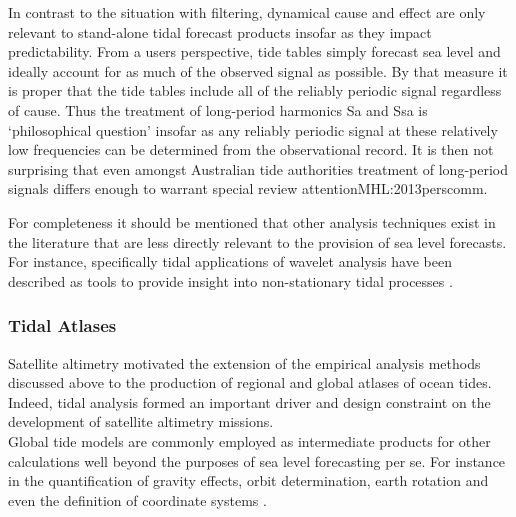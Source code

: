 In contrast to the situation with filtering, dynamical cause and effect are only relevant to stand-alone tidal forecast products insofar as they impact predictability.  From a users perspective, tide tables simply forecast sea level and ideally account for as much of the observed signal as possible.   By that measure it is proper that the tide tables include all of the reliably periodic signal regardless of cause.   
Thus the treatment of long-period harmonics Sa and Ssa is `philosophical question' \citep{Parker:2007wq} insofar as any reliably periodic signal at these relatively low frequencies can be determined from the observational record.  It is then not surprising that even amongst Australian tide authorities treatment of long-period signals differs enough to warrant special review attention{MHL:2013perscomm}.




For completeness it should be mentioned that other analysis techniques exist in the literature that are less directly relevant to the provision of sea level forecasts.\\
For instance, specifically tidal applications of wavelet analysis have been described as tools to provide insight into non-stationary tidal processes \citep{Flinchem:2000kp}.





\subsubsection{Tidal Atlases}

Satellite altimetry motivated the extension of the empirical analysis methods discussed above to the production of regional and global atlases of ocean tides.  Indeed, tidal analysis formed an important driver and design constraint on the development of satellite altimetry missions.\\
Global tide models are commonly employed as intermediate products for other calculations well beyond the purposes of sea level forecasting per se.  For instance in the quantification of gravity effects, orbit determination, earth rotation and even the definition of coordinate systems \citep{Anonymous:2004tm}.\\



